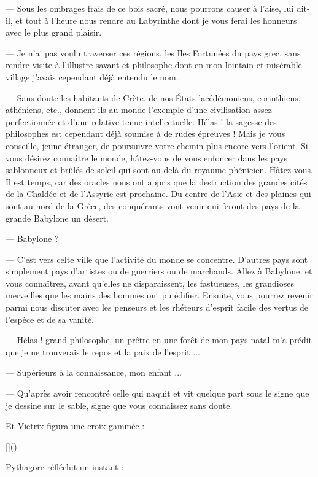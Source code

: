 \documentclass[a4paper, 11pt, oneside, polutonikogreek, french]{article}
\begin{document}
--- Sous les ombrages frais de ce bois sacré, nous pourrons causer à l'aise, lui dit-il, et tout à l'heure nous rendre au Labyrinthe dont je vous ferai les honneurs avec le plus grand plaisir.

--- Je n'ai pas voulu traverser ces régions, les Iles Fortunées du pays grec, sans rendre visite à l'illustre savant et philosophe dont en mon lointain et misérable village j'avais cependant déjà entendu le nom.

--- Sans doute les habitants de Crète, de nos États lacédémoniens, corinthiens, athéniens, etc., donnent-ils au monde l'exemple d'une civilisation assez perfectionnée et d'une relative tenue intellectuelle. Hélas ! la sagesse des philosophes est cependant déjà soumise à de rudes épreuves ! Mais je vous conseille, jeune étranger, de poursuivre votre chemin plus encore vers l'orient. Si vous désirez connaître le monde, hâtez-vous de vous enfoncer dans les pays sablonneux et brûlés de soleil qui sont au-delà du royaume phénicien. Hâtez-vous. Il est temps, car des oracles nous ont appris que la destruction des grandes cités de la Chaldée et de l'Assyrie est prochaine. Du centre de l'Asie et des plaines qui sont au nord de la Grèce, des conquérants vont venir qui feront des pays de la grande Babylone un désert.

--- Babylone ?

--- C'est vers celte ville que l'activité du monde se concentre. D'autres pays sont simplement pays d'artistes ou de guerriers ou de marchands. Allez à Babylone, et vous connaîtrez, avant qu'elles ne disparaissent, les fastueuses, les grandioses merveilles que les mains des hommes ont pu édifier. Ensuite, vous pourrez revenir parmi nous discuter avec les penseurs et les rhéteurs d'esprit facile des vertus de l'espèce et de sa vanité.

\bigskip
\centerline{\EightStarTaper}
\centerline{\EightStarTaper\EightStarTaper}
\bigskip

--- Hélas ! grand philosophe, un prêtre en une forêt de mon pays natal m'a prédit que je ne trouverais le repos et la paix de l'esprit ...

--- Supérieurs à la connaissance, mon enfant ...

--- Qu'après avoir rencontré celle qui naquit et vit quelque part sous le signe que je dessine sur le sable, signe que vous connaissez sans doute.

Et Vietrix figura une croix gammée :

[]()

Pythagore réfléchit un instant :
\end{document}
